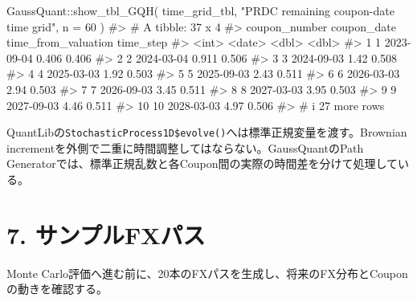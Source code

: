 \documentclass[
  letterpaper,
  DIV=11,
  numbers=noendperiod]{scrreprt}
\newenvironment{Shaded}{\begin{snugshade}}{\end{snugshade}}
\newcommand{\AttributeTok}[1]{\textcolor[rgb]{0.40,0.45,0.13}{#1}}
\newcommand{\CommentTok}[1]{\textcolor[rgb]{0.37,0.37,0.37}{#1}}
\newcommand{\DecValTok}[1]{\textcolor[rgb]{0.68,0.00,0.00}{#1}}
\newcommand{\FunctionTok}[1]{\textcolor[rgb]{0.28,0.35,0.67}{#1}}
\newcommand{\NormalTok}[1]{\textcolor[rgb]{0.00,0.23,0.31}{#1}}
\newcommand{\SpecialCharTok}[1]{\textcolor[rgb]{0.37,0.37,0.37}{#1}}
\newcommand{\StringTok}[1]{\textcolor[rgb]{0.13,0.47,0.30}{#1}}
\begin{document}
\begin{Shaded}
\begin{Highlighting}[]
\NormalTok{GaussQuant}\SpecialCharTok{::}\FunctionTok{show\_tbl\_GQH}\NormalTok{(}
\NormalTok{  time\_grid\_tbl,}
  \StringTok{"PRDC remaining coupon{-}date time grid"}\NormalTok{,}
  \AttributeTok{n =} \DecValTok{60}
\NormalTok{)}
\CommentTok{\#\textgreater{} \# A tibble: 37 x 4}
\CommentTok{\#\textgreater{}    coupon\_number coupon\_date time\_from\_valuation time\_step}
\CommentTok{\#\textgreater{}            \textless{}int\textgreater{} \textless{}date\textgreater{}                    \textless{}dbl\textgreater{}     \textless{}dbl\textgreater{}}
\CommentTok{\#\textgreater{}  1             1 2023{-}09{-}04                0.406     0.406}
\CommentTok{\#\textgreater{}  2             2 2024{-}03{-}04                0.911     0.506}
\CommentTok{\#\textgreater{}  3             3 2024{-}09{-}03                1.42      0.508}
\CommentTok{\#\textgreater{}  4             4 2025{-}03{-}03                1.92      0.503}
\CommentTok{\#\textgreater{}  5             5 2025{-}09{-}03                2.43      0.511}
\CommentTok{\#\textgreater{}  6             6 2026{-}03{-}03                2.94      0.503}
\CommentTok{\#\textgreater{}  7             7 2026{-}09{-}03                3.45      0.511}
\CommentTok{\#\textgreater{}  8             8 2027{-}03{-}03                3.95      0.503}
\CommentTok{\#\textgreater{}  9             9 2027{-}09{-}03                4.46      0.511}
\CommentTok{\#\textgreater{} 10            10 2028{-}03{-}03                4.97      0.506}
\CommentTok{\#\textgreater{} \# i 27 more rows}
\end{Highlighting}
\end{Shaded}

QuantLibの\texttt{StochasticProcess1D\$evolve()}へは標準正規変量を渡す。Brownian
incrementを外側で二重に時間調整してはならない。GaussQuantのPath
Generatorでは、標準正規乱数と各Coupon間の実際の時間差を分けて処理している。

\section{7.
サンプルFXパス}\label{ux30b5ux30f3ux30d7ux30ebfxux30d1ux30b9}

Monte
Carlo評価へ進む前に、20本のFXパスを生成し、将来のFX分布とCouponの動きを確認する。
\end{document}
